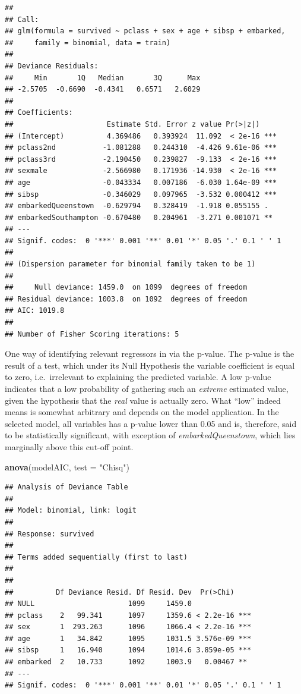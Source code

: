\documentclass[12,]{article}
\newenvironment{Shaded}{\begin{snugshade}}{\end{snugshade}}
\newcommand{\KeywordTok}[1]{\textcolor[rgb]{0.13,0.29,0.53}{\textbf{#1}}}
\newcommand{\DataTypeTok}[1]{\textcolor[rgb]{0.13,0.29,0.53}{#1}}
\newcommand{\StringTok}[1]{\textcolor[rgb]{0.31,0.60,0.02}{#1}}
\newcommand{\NormalTok}[1]{#1}
\begin{document}
\begin{verbatim}
## 
## Call:
## glm(formula = survived ~ pclass + sex + age + sibsp + embarked, 
##     family = binomial, data = train)
## 
## Deviance Residuals: 
##     Min       1Q   Median       3Q      Max  
## -2.5705  -0.6690  -0.4341   0.6571   2.6029  
## 
## Coefficients:
##                      Estimate Std. Error z value Pr(>|z|)    
## (Intercept)          4.369486   0.393924  11.092  < 2e-16 ***
## pclass2nd           -1.081288   0.244310  -4.426 9.61e-06 ***
## pclass3rd           -2.190450   0.239827  -9.133  < 2e-16 ***
## sexmale             -2.566980   0.171936 -14.930  < 2e-16 ***
## age                 -0.043334   0.007186  -6.030 1.64e-09 ***
## sibsp               -0.346029   0.097965  -3.532 0.000412 ***
## embarkedQueenstown  -0.629794   0.328419  -1.918 0.055155 .  
## embarkedSouthampton -0.670480   0.204961  -3.271 0.001071 ** 
## ---
## Signif. codes:  0 '***' 0.001 '**' 0.01 '*' 0.05 '.' 0.1 ' ' 1
## 
## (Dispersion parameter for binomial family taken to be 1)
## 
##     Null deviance: 1459.0  on 1099  degrees of freedom
## Residual deviance: 1003.8  on 1092  degrees of freedom
## AIC: 1019.8
## 
## Number of Fisher Scoring iterations: 5
\end{verbatim}

One way of identifying relevant regressors in via the p-value. The
p-value is the result of a test, which under its Null Hypothesis the
variable coefficient is equal to zero, i.e.~irrelevant to explaining the
predicted variable. A low p-value indicates that a low probability of
gathering such an \emph{extreme} estimated value, given the hypothesis
that the \emph{real} value is actually zero. What ``low'' indeed means
is somewhat arbitrary and depends on the model application. In the
selected model, all variables has a p-value lower than 0.05 and is,
therefore, said to be statistically significant, with exception of
\emph{embarkedQueenstown}, which lies marginally above this cut-off
point.

\begin{Shaded}
\begin{Highlighting}[]
\KeywordTok{anova}\NormalTok{(modelAIC, }\DataTypeTok{test =} \StringTok{"Chisq"}\NormalTok{)}
\end{Highlighting}
\end{Shaded}

\begin{verbatim}
## Analysis of Deviance Table
## 
## Model: binomial, link: logit
## 
## Response: survived
## 
## Terms added sequentially (first to last)
## 
## 
##          Df Deviance Resid. Df Resid. Dev  Pr(>Chi)    
## NULL                      1099     1459.0              
## pclass    2   99.341      1097     1359.6 < 2.2e-16 ***
## sex       1  293.263      1096     1066.4 < 2.2e-16 ***
## age       1   34.842      1095     1031.5 3.576e-09 ***
## sibsp     1   16.940      1094     1014.6 3.859e-05 ***
## embarked  2   10.733      1092     1003.9   0.00467 ** 
## ---
## Signif. codes:  0 '***' 0.001 '**' 0.01 '*' 0.05 '.' 0.1 ' ' 1
\end{verbatim}
\end{document}

